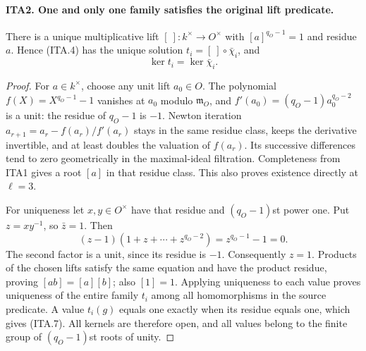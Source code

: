 \documentclass[11pt,a4paper]{article}
\numberwithin{equation}{section}
\theoremstyle{remark}\newtheorem{remark}[theorem]{Remark}
\begin{document}
\paragraph{ITA2. One and only one family satisfies the original lift predicate.}
\label{claim:ITA2}
There is a unique multiplicative lift $[\ ]:k^\times\to O^\times$
with $[a]^{q_O-1}=1$ and residue $a$.  Hence (ITA.4) has the
unique solution $t_i=[\ ]\circ\bar\chi_i$, and
\[
                         \ker t_i=\ker\bar\chi_i.       \tag{ITA.7}
\]
\begin{proof}
For $a\in k^\times$, choose any unit lift $a_0\in O$.
The polynomial $f(X)=X^{q_O-1}-1$ vanishes at $a_0$
modulo $\mathfrak m_O$, and
$f'(a_0)=(q_O-1)a_0^{q_O-2}$ is a unit: the residue of
$q_O-1$ is $-1$.  Newton iteration
$a_{r+1}=a_r-f(a_r)/f'(a_r)$ stays in the same residue
class, keeps the derivative invertible, and at least doubles
the valuation of $f(a_r)$.  Its successive differences tend
to zero geometrically in the maximal-ideal filtration.
Completeness from ITA1 gives a root $[a]$ in that residue
class.  This also proves existence directly at $\ell=3$.

For uniqueness let $x,y\in O^\times$ have that residue and
$(q_O-1)$st power one.  Put $z=xy^{-1}$, so $\bar z=1$.
Then
\[
          (z-1)(1+z+\cdots+z^{q_O-2})=z^{q_O-1}-1=0.
\]
The second factor is a unit, since its residue is $-1$.
Consequently $z=1$.  Products of the chosen lifts satisfy
the same equation and have the product residue, proving
$[ab]=[a][b]$; also $[1]=1$.  Applying uniqueness to each
value proves uniqueness of the entire family $t_i$ among
all homomorphisms in the source predicate.  A value $t_i(g)$
equals one exactly when its residue equals one, which gives
(ITA.7).  All kernels are therefore open, and all values
belong to the finite group of $(q_O-1)$st roots of unity.
\end{proof}

\end{document}
